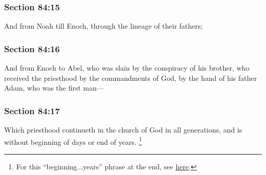 
	\subsubsection{Section 84:15} %
		\label{DC84-15}

		And from Noah till Enoch, through the lineage of their fathers;


	\subsubsection{Section 84:16} %
		\label{DC84-16}

		And from Enoch to Abel, who was slain by the conspiracy of his brother, who received the priesthood by the commandments of God, by the hand of his father Adam, who was the first man---


	\subsubsection{Section 84:17} %
		\label{DC84-17}

		Which priesthood continueth in the church of God in all generations, and is without beginning of days or end of years.%
			\footnote{%
				For this ``beginning...years'' phrase at the end, see \hyperref[END-PHRASES]{here}.
				}


